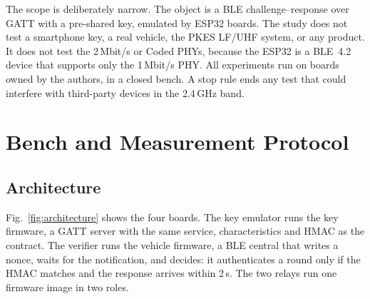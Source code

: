 \documentclass{ieeeaccess}
\begin{document}
The scope is deliberately narrow. The object is a BLE challenge--response over GATT with a pre-shared key, emulated by ESP32 boards. The study does not test a smartphone key, a real vehicle, the PKES LF/UHF system, or any product. It does not test the 2\,Mbit/s or Coded PHYs, because the ESP32 is a BLE~4.2 device that supports only the 1\,Mbit/s PHY. All experiments run on boards owned by the authors, in a closed bench. A stop rule ends any test that could interfere with third-party devices in the 2.4\,GHz band.

\section{Bench and Measurement Protocol}
\label{sec:bench}

\subsection{Architecture}

Fig.~\ref{fig:architecture} shows the four boards. The key emulator runs the key firmware, a GATT server with the same service, characteristics and HMAC as the contract. The verifier runs the vehicle firmware, a BLE central that writes a nonce, waits for the notification, and decides: it authenticates a round only if the HMAC matches and the response arrives within 2\,s. The two relays run one firmware image in two roles.
\end{document}
